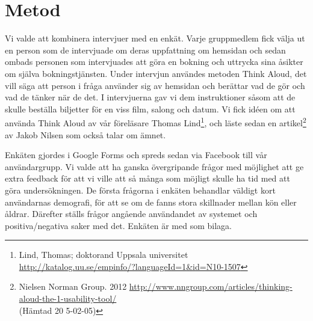 \documentclass[swedish,a4paper,11pt]{article}
\begin{document}
\newpage
\section{Metod}
Vi valde att kombinera intervjuer med en enkät. Varje gruppmedlem fick välja ut en person som de intervjuade om deras uppfattning om hemsidan och sedan ombads personen som intervjuades att göra en bokning och uttrycka sina åsikter om själva bokningstjänsten. Under intervjun användes metoden Think Aloud, det vill säga att person i fråga använder sig av hemsidan och berättar vad de gör och vad de tänker när de det. I intervjuerna gav vi dem instruktioner såsom att de skulle beställa biljetter för en viss film, salong och datum. Vi fick idéen om att använda Think Aloud av vår föreläsare Thomas Lind\footnote{Lind, Thomas; doktorand Uppsala universitet\\
\url{http://katalog.uu.se/empinfo/?languageId=1&id=N10-1507}}, och läste sedan en artikel\footnote{Nielsen Norman Group. 2012 \url{http://www.nngroup.com/articles/thinking-aloud-the-1-usability-tool/}\\{(Hämtad 20
5-02-05)}} av Jakob Nilsen som också talar om ämnet.

Enkäten gjordes i Google Forms och spreds sedan via Facebook till vår användargrupp. Vi valde att ha ganska övergripande frågor med möjlighet att ge extra feedback för att vi ville att så många som möjligt skulle ha tid med att göra undersökningen. De första frågorna i enkäten behandlar väldigt kort användarnas demografi, för att se om de fanns stora skillnader mellan kön eller åldrar. Därefter ställs frågor angående användandet av systemet och positiva/negativa saker med det. Enkäten är med som bilaga.
\end{document}
